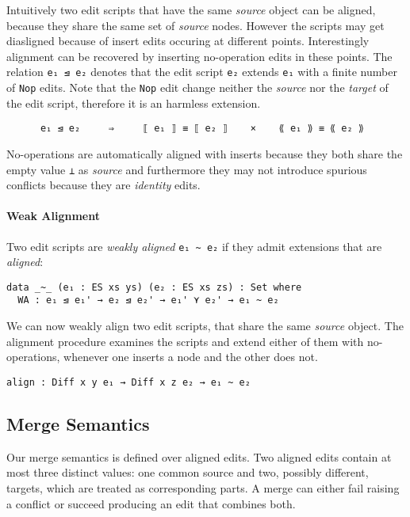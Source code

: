 \documentclass[preprint]{sigplanconf}
\begin{document}
        Intuitively two edit scripts that have the same \emph{source} object
        can be aligned, because they share the same set of \emph{source} nodes.
        However the scripts may get diasligned because of insert edits occuring
        at different points. 
        Interestingly alignment can be recovered by inserting no-operation edits in 
        these points. 
        The relation \texttt{e₁ ⊴ e₂} denotes that the edit script \texttt{e₂}
        extends \texttt{e₁} with a finite number of \texttt{Nop} edits.
        Note that the \texttt{Nop} edit change neither the \emph{source} nor 
        the \emph{target} of the edit script, therefore it is an harmless 
        extension.
        
\begin{verbatim}
      e₁ ⊴ e₂     ⇒     ⟦ e₁ ⟧ ≡ ⟦ e₂ ⟧    ×    ⟪ e₁ ⟫ ≡ ⟪ e₂ ⟫ 
\end{verbatim}

        No-operations are automatically aligned with inserts because
        they both share the empty value \texttt{⊥} as \emph{source} and furthermore
        they may not introduce spurious conflicts because they are \emph{identity}
        edits.
   
        \paragraph{Weak Alignment}
        Two edit scripts are \emph{weakly aligned} \texttt{e₁ \textasciitilde\ e₂} 
        if they admit extensions that are \emph{aligned}:
\begin{verbatim}
data _~_ (e₁ : ES xs ys) (e₂ : ES xs zs) : Set where
  WA : e₁ ⊴ e₁' → e₂ ⊴ e₂' → e₁' ⋎ e₂' → e₁ ~ e₂
\end{verbatim}

        We can now weakly align two edit scripts, that share the
        same \emph{source} object. The alignment procedure examines the scripts
        and extend either of them with no-operations, whenever one inserts a 
        node and the other does not. 
\begin{verbatim}
align : Diff x y e₁ → Diff x z e₂ → e₁ ~ e₂
\end{verbatim}

	\subsection{Merge Semantics}
        \label{merge-semantics}
	Our merge semantics is defined over aligned edits.
	Two aligned edits contain at most three distinct values: 
	one common source and two, 	possibly different, targets, which 
	are treated as corresponding parts.
	A merge can either fail raising a conflict or succeed producing
	an edit that combines both.
	
\end{document}

